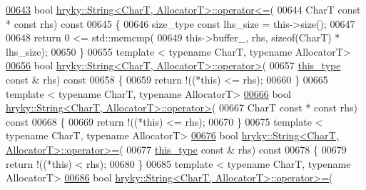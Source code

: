 \begin{DoxyCode}
\hypertarget{string_8h_source_l00643}{}\hyperlink{classhryky_1_1_string_ac358d7f8d06264f161ecd3d5c5a4b154}{00643} \textcolor{keywordtype}{bool} \hyperlink{namespacehryky_a3841c4dbefd9eeed038376b3044dec2b}{hryky::String<CharT, AllocatorT>::operator<=}(
00644     CharT \textcolor{keyword}{const} * \textcolor{keyword}{const} rhs)\textcolor{keyword}{ const}
00645 \textcolor{keyword}{}\{
00646     size\_type \textcolor{keyword}{const} lhs\_size = this->size();
00647     
00648     \textcolor{keywordflow}{return} 0 <= std::memcmp(
00649         this->buffer\_, rhs, \textcolor{keyword}{sizeof}(CharT) * lhs\_size);
00650 \}
00655 \textcolor{keyword}{template} < \textcolor{keyword}{typename} CharT, \textcolor{keyword}{typename} AllocatorT>
\hypertarget{string_8h_source_l00656}{}\hyperlink{classhryky_1_1_string_af95769666d2ba09ca36310dc1e97de8e}{00656} \textcolor{keywordtype}{bool} \hyperlink{namespacehryky_af7f213d8e2d7f4c75ac2c93d7be56365}{hryky::String<CharT, AllocatorT>::operator>}(
00657     \hyperlink{classhryky_1_1_string}{this_type} \textcolor{keyword}{const} & rhs)\textcolor{keyword}{ const}
00658 \textcolor{keyword}{}\{
00659     \textcolor{keywordflow}{return} !((*this) <= rhs);
00660 \}
00665 \textcolor{keyword}{template} < \textcolor{keyword}{typename} CharT, \textcolor{keyword}{typename} AllocatorT>
\hypertarget{string_8h_source_l00666}{}\hyperlink{classhryky_1_1_string_a7f2c88da9ad92fa5fcc3cdaa4f26d4d7}{00666} \textcolor{keywordtype}{bool} \hyperlink{namespacehryky_af7f213d8e2d7f4c75ac2c93d7be56365}{hryky::String<CharT, AllocatorT>::operator>}(
00667     CharT \textcolor{keyword}{const} * \textcolor{keyword}{const} rhs)\textcolor{keyword}{ const}
00668 \textcolor{keyword}{}\{
00669     \textcolor{keywordflow}{return} !((*this) <= rhs);
00670 \}
00675 \textcolor{keyword}{template} < \textcolor{keyword}{typename} CharT, \textcolor{keyword}{typename} AllocatorT>
\hypertarget{string_8h_source_l00676}{}\hyperlink{classhryky_1_1_string_a60476053dfd6e120ff03cea4b4575af7}{00676} \textcolor{keywordtype}{bool} \hyperlink{namespacehryky_acc487ba69503ce030df6f4b9db4cbe8b}{hryky::String<CharT, AllocatorT>::operator>=}(
00677     \hyperlink{classhryky_1_1_string}{this_type} \textcolor{keyword}{const} & rhs)\textcolor{keyword}{ const}
00678 \textcolor{keyword}{}\{
00679     \textcolor{keywordflow}{return} !((*this) < rhs);
00680 \}
00685 \textcolor{keyword}{template} < \textcolor{keyword}{typename} CharT, \textcolor{keyword}{typename} AllocatorT>
\hypertarget{string_8h_source_l00686}{}\hyperlink{classhryky_1_1_string_af179712fb033e3cc1f0699d8ec4abed5}{00686} \textcolor{keywordtype}{bool} \hyperlink{namespacehryky_acc487ba69503ce030df6f4b9db4cbe8b}{hryky::String<CharT, AllocatorT>::operator>=}(

\end{DoxyCode}
